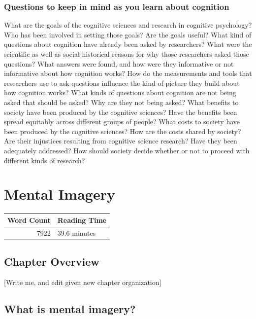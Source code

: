 \documentclass[
  oneside,
  12pt]{crumpbook}
\begin{document}
\hypertarget{questions-to-keep-in-mind-as-you-learn-about-cognition}{%
\subsection{Questions to keep in mind as you learn about cognition}\label{questions-to-keep-in-mind-as-you-learn-about-cognition}}

What are the goals of the cognitive sciences and research in cognitive psychology? Who has been involved in setting those goals? Are the goals useful? What kind of questions about cognition have already been asked by researchers? What were the scientific as well as social-historical reasons for why those researchers asked those questions? What answers were found, and how were they informative or not informative about how cognition works? How do the measurements and tools that researchers use to ask questions influence the kind of picture they build about how cognition works? What kinds of questions about cognition are not being asked that should be asked? Why are they not being asked? What benefits to society have been produced by the cognitive sciences? Have the benefits been spread equitably across different groups of people? What costs to society have been produced by the cognitive sciences? How are the costs shared by society? Are their injustices resulting from cognitive science research? Have they been adequately addressed? How should society decide whether or not to proceed with different kinds of research?

\hypertarget{mental-imagery}{%
\chapter{Mental Imagery}\label{mental-imagery}}

\begin{tabular}{r|l}
\hline
Word Count & Reading Time\\
\hline
7922 & 39.6 minutes\\
\hline
\end{tabular}

\hypertarget{chapter-overview-1}{%
\section{Chapter Overview}\label{chapter-overview-1}}

{[}Write me, and edit given new chapter organization{]}

\hypertarget{what-is-mental-imagery}{%
\section{What is mental imagery?}\label{what-is-mental-imagery}}
\end{document}
